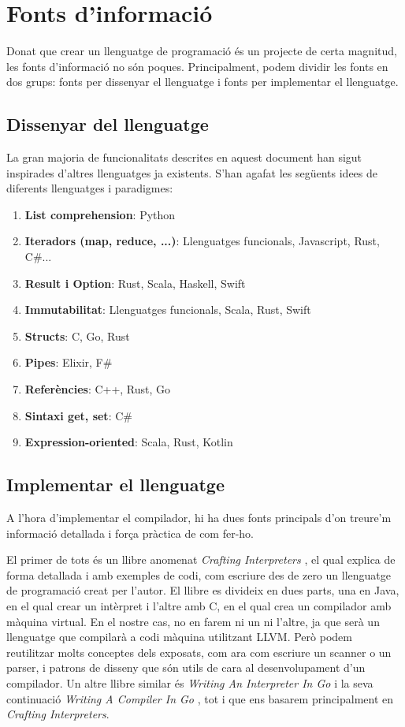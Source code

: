 ﻿\documentclass{article}
\begin{document}
\section{Fonts d'informació}
Donat que crear un llenguatge de programació és un projecte de certa magnitud,
les fonts d'informació no són poques. Principalment, podem dividir les fonts en
dos grups: fonts per dissenyar el llenguatge i fonts per implementar el llenguatge.

\subsection{Dissenyar del llenguatge}
La gran majoria de funcionalitats descrites en aquest document han sigut
inspirades d'altres llenguatges ja existents. S'han agafat les següents idees de
diferents llenguatges i paradigmes:

\begin{enumerate}
\item \textbf{List comprehension}: Python
\item \textbf{Iteradors (map, reduce, ...)}: Llenguatges funcionals, Javascript, Rust, C\#...
\item \textbf{Result i Option}: Rust, Scala, Haskell, Swift
\item \textbf{Immutabilitat}: Llenguatges funcionals, Scala, Rust, Swift
\item \textbf{Structs}: C, Go, Rust
\item \textbf{Pipes}: Elixir, F\#
\item \textbf{Referències}: C++, Rust, Go
\item \textbf{Sintaxi get, set}: C\#
\item \textbf{Expression-oriented}: Scala, Rust, Kotlin
\end{enumerate}

\subsection{Implementar el llenguatge}
A l'hora d'implementar el compilador, hi ha dues fonts principals d'on treure'm
informació detallada i força pràctica de com fer-ho.

El primer de tots és un llibre anomenat \textit{Crafting Interpreters}
\cite{crafting-interpreters}, el qual explica de forma detallada i amb exemples
de codi, com escriure des de zero un llenguatge de programació creat per l'autor.
El llibre es divideix en dues parts, una en Java, en el qual crear un intèrpret
i l'altre amb C, en el qual crea un compilador amb màquina virtual. En el nostre cas,
no en farem ni un ni l'altre, ja que serà un llenguatge que compilarà a codi
màquina utilitzant LLVM. Però podem reutilitzar molts conceptes dels exposats,
com ara com escriure un scanner o un parser, i patrons de disseny que són
utils de cara al desenvolupament d'un compilador. Un altre llibre similar és
\textit{Writing An Interpreter In Go} \cite{interpreterbook} i la seva
continuació \textit{Writing A Compiler In Go} \cite{compilerbook}, tot i que
ens basarem principalment en \textit{Crafting Interpreters}.
\end{document}
